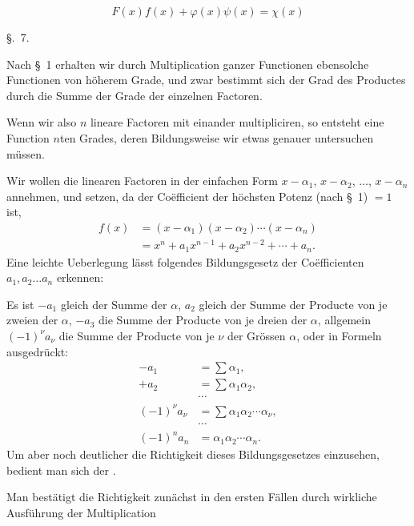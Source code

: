 
\begin{equation}
 F(x)f(x)+\varphi(x)\psi(x)=\chi(x)
\tag{26}
\end{equation}

\begin{center}
{\large \S.\ 7.}

\vspace{0.5em}
{\large{}}
\end{center}

Nach \S~1 erhalten wir durch Multiplication ganzer Functionen ebensolche Functionen von höherem Grade, und zwar bestimmt sich der Grad des Productes durch die Summe der Grade der einzelnen Factoren.

Wenn wir also $n$ lineare Factoren mit einander multipliciren, so entsteht eine Function $n$ten Grades, deren Bildungsweise wir etwas genauer untersuchen müssen.

Wir wollen die linearen Factoren in der einfachen Form $x-\alpha_1$, $x-\alpha_2$, $\ldots$, $x-\alpha_n$ annehmen, und setzen, da der Coëfficient der höchsten Potenz (nach \S~1) $=1$ ist,
\begin{equation}
\begin{aligned}
 f(x)&=(x-\alpha_1)(x-\alpha_2)\cdots(x-\alpha_n)\\
 &=x^n+a_1x^{n-1}+a_2x^{n-2}+\cdots+a_n.
\end{aligned}
\tag{1}
\end{equation}
Eine leichte Ueberlegung lässt folgendes Bildungsgesetz der Coëfficienten $a_1,a_2\ldots a_n$ erkennen:

Es ist $-a_1$ gleich der Summe der $\alpha$, $a_2$ gleich der Summe der Producte von je zweien der $\alpha$, $-a_3$ die Summe der Producte von je dreien der $\alpha$, allgemein $(-1)^\nu a_\nu$ die Summe der Producte von je $\nu$ der Grössen $\alpha$, oder in Formeln ausgedrückt:
\begin{equation}
\begin{aligned}
-a_1&=\sum \alpha_1,\\
+a_2&=\sum \alpha_1\alpha_2,\\
&\cdots\\
(-1)^\nu a_\nu&=\sum \alpha_1\alpha_2\cdots\alpha_\nu,\\
&\cdots\\
(-1)^n a_n&=\alpha_1\alpha_2\cdots\alpha_n.
\end{aligned}
\tag{2}
\end{equation}
Um aber noch deutlicher die Richtigkeit dieses Bildungsgesetzes einzusehen, bedient man sich der .

Man bestätigt die Richtigkeit zunächst in den ersten Fällen durch wirkliche Ausführung der Multiplication
